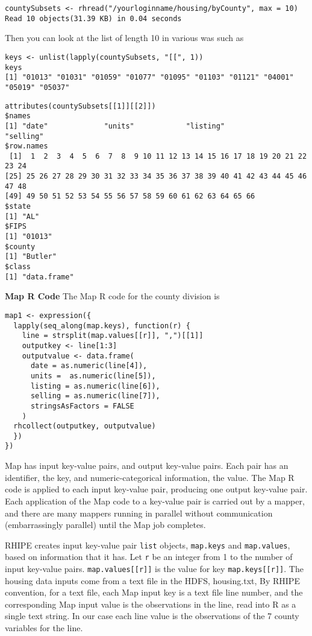 \begin{verbatim}
countySubsets <- rhread("/yourloginname/housing/byCounty", max = 10)
Read 10 objects(31.39 KB) in 0.04 seconds
\end{verbatim}

Then you can look at the list of length 10 in various was such as

\begin{verbatim}
keys <- unlist(lapply(countySubsets, "[[", 1))
keys
[1] "01013" "01031" "01059" "01077" "01095" "01103" "01121" "04001" "05019" "05037"
\end{verbatim}

\begin{verbatim}
attributes(countySubsets[[1]][[2]])
$names
[1] "date"             "units"            "listing"             "selling"
$row.names
 [1]  1  2  3  4  5  6  7  8  9 10 11 12 13 14 15 16 17 18 19 20 21 22 23 24 
[25] 25 26 27 28 29 30 31 32 33 34 35 36 37 38 39 40 41 42 43 44 45 46 47 48 
[49] 49 50 51 52 53 54 55 56 57 58 59 60 61 62 63 64 65 66
$state
[1] "AL"
$FIPS
[1] "01013"
$county
[1] "Butler"
$class
[1] "data.frame"
\end{verbatim}

\textbf{Map R Code}
The Map R code for the county division is

\begin{verbatim}
map1 <- expression({
  lapply(seq_along(map.keys), function(r) {
    line = strsplit(map.values[[r]], ",")[[1]]
    outputkey <- line[1:3]
    outputvalue <- data.frame(
      date = as.numeric(line[4]),
      units =  as.numeric(line[5]),
      listing = as.numeric(line[6]),
      selling = as.numeric(line[7]),
      stringsAsFactors = FALSE
    )
  rhcollect(outputkey, outputvalue)
  })
})
\end{verbatim}

Map has input key-value pairs, and output key-value pairs. Each pair has an
identifier, the key, and numeric-categorical information, the value. 
The Map R code is applied to each input key-value pair, producing one
output key-value pair. Each application of the Map code to a
key-value pair is carried out by a mapper, and there are many mappers running
in parallel without communication (embarrassingly parallel) until the Map job
completes.

RHIPE creates input key-value pair \texttt{list} objects, \texttt{map.keys} and
\texttt{map.values}, based on information that it has.
Let \texttt{r} be an integer from 1 to the number of input key-value pairs.
\texttt{map.values[[r]]} is the value for key \texttt{map.keys[[r]]}.
The housing data inputs come from a text file in the HDFS, housing.txt,
By RHIPE convention, for a text file, each Map input key is a text file line
number, and the corresponding  Map input value is the observations in the line,
read into R as a single text string.
In our case each line value is the observations of the 7 county variables for the line.

